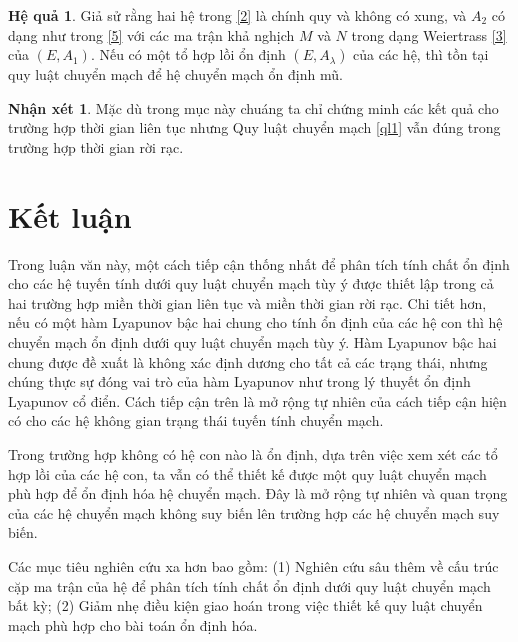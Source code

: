 \documentclass[12pt,a4paper]{report}
\theoremstyle{definition}
\newtheorem{corollary}{Hệ quả}
\newtheorem{nx}{Nhận xét}
\theoremstyle{definition}
\numberwithin{dl}{chapter}
\numberwithin{vd}{chapter}
\numberwithin{corollary}{chapter}
\numberwithin{lemma}{chapter}
\numberwithin{md}{chapter}
\numberwithin{dn}{chapter}
\numberwithin{cy}{chapter}
\numberwithin{nx}{chapter}
\begin{document}
\begin{corollary} Giả sử rằng hai hệ trong \eqref{2} là chính quy và không có xung, và $A_{2}$ có dạng như trong \eqref{5} với các ma trận khả nghịch $M$ và $N$ trong dạng Weiertrass \eqref{3} của $\left(E, A_{1}\right)$. Nếu có một tổ hợp lồi ổn định $\left(E, A_{\lambda}\right)$ của các hệ, thì tồn tại quy luật chuyển mạch để hệ chuyển mạch ổn định mũ.
\end{corollary}
\begin{nx}Mặc dù trong mục này chuáng ta chỉ chứng minh các kết quả cho trường hợp thời gian liên tục nhưng Quy luật chuyển mạch \ref{ql1} vẫn đúng trong trường hợp thời gian rời rạc.
\end{nx}
\chapter{Kết luận}

Trong luận văn này, một cách tiếp cận thống nhất để phân tích tính chất ổn định cho các hệ tuyến tính dưới quy luật chuyển mạch tùy ý được thiết lập trong cả hai trường hợp miền thời gian liên tục và miền thời gian rời rạc.
Chi tiết hơn, nếu có một hàm Lyapunov bậc hai chung cho tính ổn định của các hệ con thì hệ chuyển mạch ổn định dưới quy luật chuyển mạch tùy ý.
Hàm Lyapunov bậc hai chung được đề xuất là không xác định dương cho tất cả các trạng thái, nhưng chúng thực sự đóng vai trò của hàm Lyapunov như trong lý thuyết ổn định Lyapunov cổ điển. Cách tiếp cận trên là mở rộng tự nhiên của cách tiếp cận hiện có cho các hệ không gian trạng thái tuyến tính chuyển mạch.

Trong trường hợp không có hệ con nào là ổn định, dựa trên việc xem xét các tổ hợp lồi của các hệ con, ta vẫn có thể thiết kế được một quy luật chuyển mạch phù hợp để ổn định hóa hệ chuyển mạch. Đây là mở rộng tự nhiên và quan trọng của các hệ chuyển mạch không suy biến lên trường hợp các hệ chuyển mạch suy biến.

Các mục tiêu nghiên cứu xa hơn bao gồm: (1) Nghiên cứu sâu thêm về cấu trúc cặp ma trận của hệ để phân tích tính chất ổn định dưới quy luật chuyển mạch bất kỳ; (2) Giảm nhẹ điều kiện giao hoán trong việc thiết kế quy luật chuyển mạch phù hợp cho bài toán ổn định hóa.

\newpage
\setlength{\parskip}{0.3cm}


\end{document}
